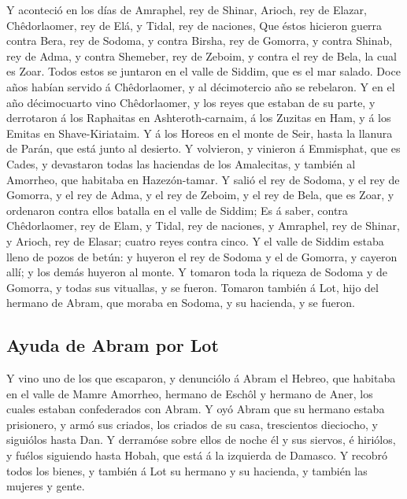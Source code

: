  Y aconteció en los días de Amraphel, rey de Shinar,
Arioch, rey de Elazar, Chêdorlaomer, rey de Elá, y Tidal, rey de
naciones,  Que éstos hicieron guerra contra Bera, rey de
Sodoma, y contra Birsha, rey de Gomorra, y contra Shinab, rey de Adma, y
contra Shemeber, rey de Zeboim, y contra el rey de Bela, la cual es
Zoar.  Todos estos se juntaron en el valle de Siddim, que
es el mar salado.  Doce años habían servido á
Chêdorlaomer, y al décimotercio año se rebelaron.  Y en el
año décimocuarto vino Chêdorlaomer, y los reyes que estaban de su parte,
y derrotaron á los Raphaitas en Ashteroth-carnaim, á los Zuzitas en Ham,
y á los Emitas en Shave-Kiriataim.  Y á los Horeos en el
monte de Seir, hasta la llanura de Parán, que está junto al desierto.
 Y volvieron, y vinieron á Emmisphat, que es Cades, y
devastaron todas las haciendas de los Amalecitas, y también al Amorrheo,
que habitaba en Hazezón-tamar.  Y salió el rey de Sodoma,
y el rey de Gomorra, y el rey de Adma, y el rey de Zeboim, y el rey de
Bela, que es Zoar, y ordenaron contra ellos batalla en el valle de
Siddim;  Es á saber, contra Chêdorlaomer, rey de Elam, y
Tidal, rey de naciones, y Amraphel, rey de Shinar, y Arioch, rey de
Elasar; cuatro reyes contra cinco.  Y el valle de Siddim
estaba lleno de pozos de betún: y huyeron el rey de Sodoma y el de
Gomorra, y cayeron allí; y los demás huyeron al monte.  Y
tomaron toda la riqueza de Sodoma y de Gomorra, y todas sus vituallas, y
se fueron.  Tomaron también á Lot, hijo del hermano de
Abram, que moraba en Sodoma, y su hacienda, y se fueron.

\hypertarget{ayuda-de-abram-por-lot}{%
\subsection{Ayuda de Abram por Lot}\label{ayuda-de-abram-por-lot}}

 Y vino uno de los que escaparon, y denunciólo á Abram el
Hebreo, que habitaba en el valle de Mamre Amorrheo, hermano de Eschôl y
hermano de Aner, los cuales estaban confederados con Abram.
 Y oyó Abram que su hermano estaba prisionero, y armó sus
criados, los criados de su casa, trescientos dieciocho, y siguiólos
hasta Dan.  Y derramóse sobre ellos de noche él y sus
siervos, é hiriólos, y fuélos siguiendo hasta Hobah, que está á la
izquierda de Damasco.  Y recobró todos los bienes, y
también á Lot su hermano y su hacienda, y también las mujeres y gente.


